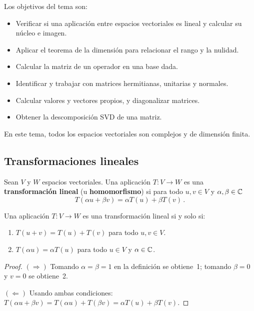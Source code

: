 Los objetivos del tema son:
\begin{itemize}
  \item Verificar si una aplicación entre espacios vectoriales es lineal y calcular su núcleo e imagen.
  \item Aplicar el teorema de la dimensión para relacionar el rango y la nulidad.
  \item Calcular la matriz de un operador en una base dada.
  \item Identificar y trabajar con matrices hermitianas, unitarias y normales.
  \item Calcular valores y vectores propios, y diagonalizar matrices.
  \item Obtener la descomposición SVD de una matriz.
\end{itemize}

\begin{nota}
  En este tema, todos los espacios vectoriales son complejos y de dimensión finita.
\end{nota}

\subsection{Transformaciones lineales}

\begin{defi}
  Sean $V$ y $W$ espacios vectoriales. Una aplicación $T\colon V\to W$ es una \textbf{transformación lineal} (u \textbf{homomorfismo}) si para todo $u,v\in V$ y $\alpha,\beta\in\mathbb{C}$
  \[
    T(\alpha u + \beta v) = \alpha T(u) + \beta T(v)\,.
  \]
\end{defi}

\begin{prop}
  Una aplicación $T\colon V\to W$ es una transformación lineal si y solo si:
  \begin{enumerate}
    \item $T(u+v) = T(u)+T(v)$ para todo $u,v\in V$.
    \item $T(\alpha u) = \alpha T(u)$ para todo $u\in V$ y $\alpha\in\mathbb{C}$.
  \end{enumerate}
\end{prop}
\begin{proof}
  $(\Rightarrow)$ Tomando $\alpha=\beta=1$ en la definición se obtiene~1; tomando $\beta=0$ y $v=0$ se obtiene~2.

  $(\Leftarrow)$ Usando ambas condiciones: $T(\alpha u+\beta v)=T(\alpha u)+T(\beta v)=\alpha T(u)+\beta T(v)$.
\end{proof}

